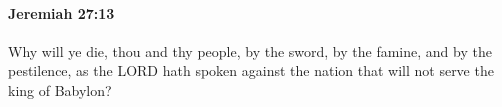 
		\paragraph{Jeremiah 27:13} %
			\label{JEREMIAH-27-13}

			Why will ye die, thou and thy people, by the sword, by the famine, and by the pestilence, as the LORD hath spoken against the nation that will not serve the king of Babylon?


